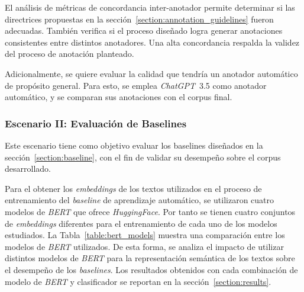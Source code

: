El an\'alisis de m\'etricas de concordancia inter-anotador permite determinar si las directrices propuestas en la 
secci\'on~\ref{section:annotation_guidelines} fueron adecuadas. Tambi\'en verifica si el proceso dise\~nado logra generar
anotaciones consistentes entre distintos anotadores. Una alta concordancia respalda la validez del proceso de anotaci\'on
planteado.

Adicionalmente, se quiere evaluar la calidad que tendr\'ia un anotador autom\'atico de prop\'osito general. Para esto, se 
emplea \emph{ChatGPT}~3.5 como anotador autom\'atico, y se comparan sus anotaciones con el corpus final.

\subsubsection{Escenario II: Evaluaci\'on de Baselines}
Este escenario tiene como objetivo evaluar los baselines dise\~nados en la secci\'on~\ref{section:baseline}, con el fin de 
validar su desempe\~no sobre el corpus desarrollado.

Para el obtener los \emph{embeddings} de los textos utilizados en el proceso de entrenamiento del \emph{baseline} 
de aprendizaje autom\'atico, se utilizaron cuatro modelos de \emph{BERT} que ofrece \emph{HuggingFace}.
Por tanto se tienen cuatro conjuntos de \emph{embeddings} diferentes para el entrenamiento de cada uno de 
los modelos estudiados. La Tabla~\ref{table:bert_models} muestra una comparaci\'on entre los modelos de \emph{BERT} utilizados.
De esta forma, se analiza el impacto de utilizar distintos modelos de \emph{BERT} para la representaci\'on 
sem\'antica de los textos sobre el desempe\~no de los \emph{baselines}. Los resultados obtenidos con cada 
combinaci\'on de modelo de \emph{BERT} y clasificador se reportan en la secci\'on~\ref{section:results}.

\begin{table}[htpb]
    \centering
    \caption{Comparativa de modelos de \emph{BERT} utilizados.}
    \label{table:bert_models}
\end{table}

